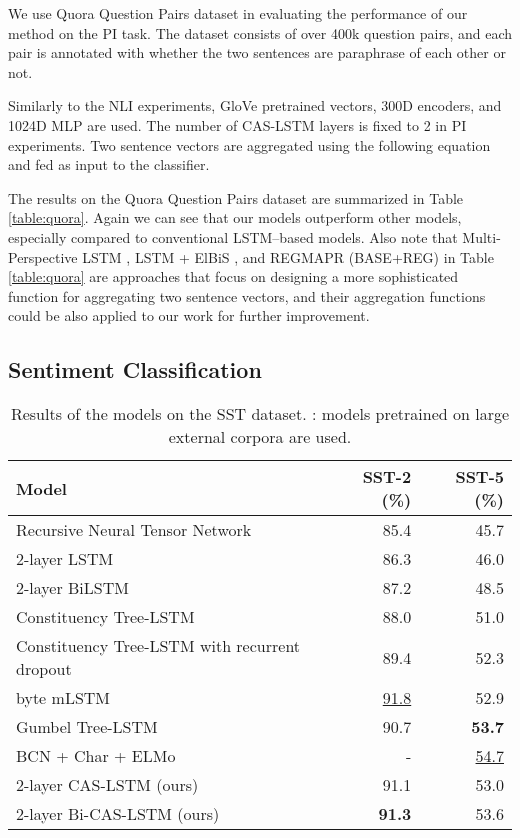 \documentclass[wcp]{jmlr}
\begin{document}
    We use Quora Question Pairs dataset \citep{wang2017bilateral} in evaluating the performance of our method on the PI task.
    The dataset consists of over 400k question pairs, and each pair is annotated with whether the two sentences are paraphrase of each other or not.
    
    Similarly to the NLI experiments, GloVe pretrained vectors, 300D encoders, and 1024D MLP are used.
    The number of CAS-LSTM layers is fixed to 2 in PI experiments.
    Two sentence vectors are aggregated using the following equation and fed as input to the classifier.
    
    
    The results on the Quora Question Pairs dataset are summarized in Table \ref{table:quora}.
    Again we can see that our models outperform other models, especially compared to conventional LSTM--based models.
    Also note that Multi-Perspective LSTM \citep{wang2017bilateral}, LSTM + ElBiS \citep{choi2018elbis}, and REGMAPR (BASE+REG) \citep{brahma2018regmapr} in Table \ref{table:quora} are approaches that focus on designing a more sophisticated function for aggregating two sentence vectors, and their aggregation functions could be also applied to our work for further improvement.
    
    \subsection{Sentiment Classification}
    
    \begin{table*}[t]
        \centering
        \begin{tabular}{l r r}
            \hline
            \bf{Model} & \bf{SST-2 (\%)} & \bf{SST-5 (\%)} \\
            \hline
            Recursive Neural Tensor Network \citep{socher2013recursive} & 85.4 & 45.7 \\
            2-layer LSTM \citep{tai2015treelstm} & 86.3 & 46.0 \\
            2-layer BiLSTM \citep{tai2015treelstm} & 87.2 & 48.5 \\
            Constituency Tree-LSTM \citep{tai2015treelstm} & 88.0 & 51.0 \\
            Constituency Tree-LSTM with recurrent dropout \citep{looks2017deep} & 89.4 & 52.3 \\
            byte mLSTM \citep{radford2017learning} & \underline{91.8} & 52.9 \\
            Gumbel Tree-LSTM \citep{choi2018learning} & 90.7 & \bf{53.7} \\
            BCN + Char + ELMo \citep{peters2018elmo} & - & \underline{54.7} \\
            \hline
            2-layer CAS-LSTM (ours) & 91.1 & 53.0	 \\
            2-layer Bi-CAS-LSTM (ours) & \bf{91.3} & 53.6 \\
            \hline
        \end{tabular}
        \caption{Results of the models on the SST dataset. : models pretrained on large external corpora are used.}
        \label{table:sst}
    \end{table*}
    
\end{document}
